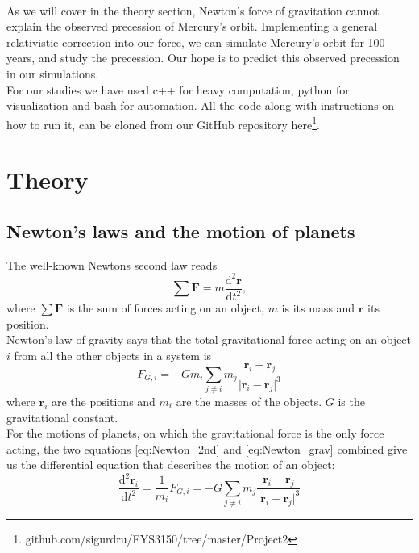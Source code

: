 \documentclass[reprint, english,notitlepage,nofootinbib]{revtex4-1}  %
\newcommand{\vc}[1]{\mathbf{#1}}
\begin{document}
\\
As we will cover in the theory section, Newton's force of gravitation cannot explain the observed precession of Mercury's orbit. Implementing a general relativistic correction into our force, we can simulate Mercury's orbit for 100 years, and study the precession. Our hope is to predict this observed precession in our simulations.
\\
For our studies we have used c++ for heavy computation, python for visualization and bash for automation. All the code along with instructions on how to run it, can be cloned from our GitHub repository here\footnote{github.com/sigurdru/FYS3150/tree/master/Project2}.

\section{Theory}

\subsection{Newton's laws and the motion of planets}

The well-known Newtons second law reads
\begin{equation}
  \label{eq:Newton_2nd}
  \sum \vc F = m \frac{\mathrm d^2 \vc r}{\mathrm d t^2},
\end{equation}
where $\sum \vc F$ is the sum of forces acting on an object, $m$ is its mass and $\vc r$ its position.
\\
Newton's law of gravity says that the total gravitational force acting on an object $i$ from all the other objects in a system is
\begin{equation}
  \label{eq:Newton_grav}
  F_{G, i} = - G m_i \sum_{j \neq i} m_j \frac{\vc r_i - \vc r_j}{ \lvert \vc r_i - \vc r_j \rvert ^3}
\end{equation}
where $\vc r_i$ are the positions and $m_i$ are the masses of the objects. $G$ is the gravitational constant.
\\
For the motions of planets, on which the gravitational force is the only force acting, the two equations \ref{eq:Newton_2nd} and \ref{eq:Newton_grav} combined give us the differential equation that describes the motion of an object:
\begin{equation}
  \label{eq:DE}
  \frac{\mathrm d^2 \vc r_i}{\mathrm d t^2} = \frac{1}{m_i} F_{G, i} = - G \sum_{j \neq i} m_j \frac{\vc r_i - \vc r_j}{ \lvert \vc r_i - \vc r_j \rvert ^3}
\end{equation}
\end{document}
